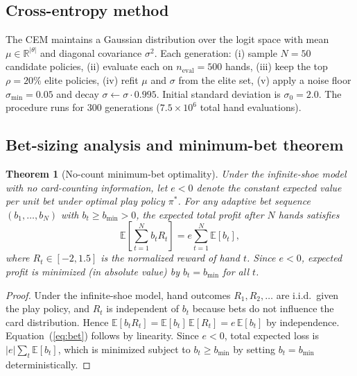 \documentclass[12pt]{article}
\newtheorem{theorem}{Theorem}
\begin{document}
\subsection{Cross-entropy method}

The CEM\cite{Rubinstein1999,DeBoer2005} maintains a Gaussian distribution over the
logit space with mean $\mu \in \mathbb{R}^{|\theta|}$ and diagonal covariance
$\sigma^2$.  Each generation: (i) sample $N=50$ candidate policies, (ii) evaluate each
on $n_\mathrm{eval}=500$ hands, (iii) keep the top $\rho=20\%$ elite policies,
(iv) refit $\mu$ and $\sigma$ from the elite set, (v) apply a noise floor
$\sigma_\mathrm{min} = 0.05$ and decay $\sigma \leftarrow \sigma \cdot 0.995$.
Initial standard deviation is $\sigma_0 = 2.0$.  The procedure runs for $300$
generations ($7.5 \times 10^6$ total hand evaluations).

\subsection{Bet-sizing analysis and minimum-bet theorem}

\begin{theorem}[No-count minimum-bet optimality]
\label{thm:minbet}
Under the infinite-shoe model with no card-counting information, let $e < 0$ denote
the constant expected value per unit bet under optimal play policy $\pi^*$.  For any
adaptive bet sequence $(b_1, \ldots, b_N)$ with $b_t \geq b_\mathrm{min} > 0$, the
expected total profit after $N$ hands satisfies
\begin{equation}
  \mathbb{E}\!\left[\sum_{t=1}^N b_t R_t\right] = e \sum_{t=1}^N \mathbb{E}[b_t],
  \label{eq:bet}
\end{equation}
where $R_t \in [-2, 1.5]$ is the normalized reward of hand $t$.
Since $e < 0$, expected profit is minimized (in absolute value) by $b_t = b_\mathrm{min}$
for all $t$.
\end{theorem}

\begin{proof}
Under the infinite-shoe model, hand outcomes $R_1, R_2, \ldots$ are i.i.d.\ given the
play policy, and $R_t$ is independent of $b_t$ because bets do not influence the card
distribution.  Hence $\mathbb{E}[b_t R_t] = \mathbb{E}[b_t]\,\mathbb{E}[R_t]
= e\,\mathbb{E}[b_t]$ by independence.  Equation~(\ref{eq:bet}) follows by linearity.
Since $e < 0$, total expected loss is $|e|\sum_t \mathbb{E}[b_t]$, which is minimized
subject to $b_t \geq b_\mathrm{min}$ by setting $b_t = b_\mathrm{min}$ deterministically.
\end{proof}
\end{document}

